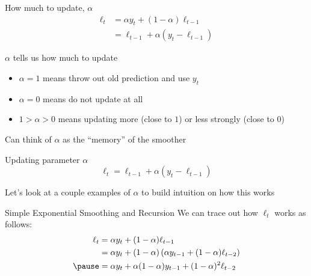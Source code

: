 \documentclass[aspectratio=169,t,11pt,table]{beamer}
\begin{document}
\begin{frame}{How much to update, $\alpha$}
  \vspace*{-\bigskipamount}
  \begin{align*}
    \ell_{t} &= \alpha y_t + (1 - \alpha) \ell_{t-1} \\
             &= \ell_{t-1} + \alpha \left( y_t - \ell_{t-1} \right)
  \end{align*}

  \bigskip
  $\alpha$ tells us how much to update
  \begin{itemize}
    \item $\alpha = 1$ means throw out old prediction and use $y_t$
    
    \item $\alpha = 0$ means do not update at all
    
    \item $1 > \alpha > 0$ means updating more (close to $1$) or less strongly (close to $0$)
  \end{itemize}

  \bigskip
  Can think of $\alpha$ as the ``memory'' of the smoother
\end{frame}

\begin{frame}{Updating parameter $\alpha$}
  \vspace*{-\bigskipamount}
  $$
    \ell_{t} = \ell_{t-1} + \alpha \left( y_t - \ell_{t-1} \right)
  $$

  \bigskip
  Let's look at a couple examples of $\alpha$ to build intuition on how this works
\end{frame}


\begin{frame}{Simple Exponential Smoothing and Recursion}
  We can trace out how $\ell_t$ works as follows:
  \begin{align*}
    \ell_{t} 
    &= \alpha y_t + (1 - \alpha) \ell_{t-1} \\
    &= \alpha y_t + (1 - \alpha) \left( \alpha y_{t-1} + (1 - \alpha) \ell_{t-2} \right) \\
    \pause
    &= \alpha y_t + \alpha (1 - \alpha) y_{t-1} + (1 - \alpha)^2 \ell_{t-2}  \\
  \end{align*}
\end{frame}
\end{document}
